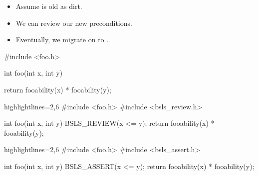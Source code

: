\begin{frame}[fragile]
\begin{overprint}
  \begin{itemize}
  \item<1->{Assume  is old as dirt.}
  \item<2->{We can review our new preconditions.}
  \item<3->{Eventually, we migrate on to .}
  \end{itemize}
\end{overprint}

\begin{overprint}
\begin{cppcodebox}
#include <foo.h>
  

int foo(int x, int y)
{

  return fooability(x) * fooability(y);
}  
\end{cppcodebox}

\begin{cppcodebox*}{highlightlines={2,6}}
#include <foo.h>
#include <bsls\_review.h>
  
int foo(int x, int y)
{
  BSLS_REVIEW(x <= y);
  return fooability(x) * fooability(y);
}  
\end{cppcodebox*}

\begin{cppcodebox*}{highlightlines={2,6}}
#include <foo.h>
#include <bsls\_assert.h>
  
int foo(int x, int y)
{
  BSLS_ASSERT(x <= y);
  return fooability(x) * fooability(y);
}  
\end{cppcodebox*}

\end{overprint}
\end{frame}

